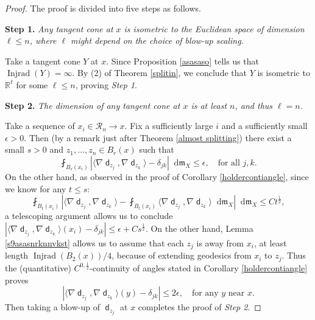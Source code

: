 \documentclass[11pt,reqno]{amsart}
\theoremstyle{definition}
\numberwithin{equation}{section}
\newcommand{\dR}{\mathbb{R}}
\newcommand{\di}{\mathop{}\!\mathrm{d}}
\newcommand{\meas}{\mathfrak{m}}
\DeclareMathOperator{\dist}{\mathsf{d}}
\DeclareMathOperator{\Injrad}{Injrad}
\begin{document}
\begin{proof}
The proof is divided into five steps as follows.

\smallskip

\textbf{Step 1.} \textit{Any tangent cone at $x$ is isometric to the Euclidean space of dimension $\ell \le n$, where $\ell$ might depend on the choice of blow-up scaling.}

\smallskip

Take a tangent cone $Y$ at $x$. Since Proposition \ref{asasaso} tells us that
$
    \Injrad(Y)=\infty.
$
By (2) of Theorem \ref{splitin}, we conclude that $Y$ is isometric to $\dR^{\ell}$
for some $\ell \leq n$, proving \textit{Step 1}.
 

\smallskip


\textbf{Step 2.} \textit{The dimension of any tangent cone at $x$ is at least $n$, and thus $\ell = n$.}

\smallskip

Take a sequence of $x_i \in \mathcal{R}_n \to x$. Fix a sufficiently large $i$ and a sufficiently small $\epsilon>0$. Then (by a remark just after Theorem \ref{almost splitting}) there exist a small $s>0$ and $z_1, \ldots, z_n \in B_r(x)$  such that 
\begin{equation}\label{eq:spl}
\fint_{B_s(x_i)}\left| \langle \nabla \dist_{z_j}, \nabla \dist_{z_k}\rangle-\delta_{jk}\right| \di \meas_X \le \epsilon, \quad \text{for all $j, k$.}
\end{equation}
On the other hand, as observed in the proof of Corollary \ref{holdercontiangle}, since we know for any $t \le s$:
\begin{equation}\label{eq:splsaas}
\fint_{B_t(x_i)}\left| \langle \nabla \dist_{z_j}, \nabla \dist_{z_k}\rangle-\fint_{B_t(x_i)}\langle \nabla \dist_{z_j}, \nabla \dist_{z_k}\rangle \di \meas_X\right| \di \meas_X \le Ct^{\frac{1}{2}},
\end{equation}
a telescoping argument allows us to conclude 
$
    \left|\langle \nabla \dist_{z_j}, \nabla \dist_{z_k}\rangle(x_i) -\delta_{jk} \right| \le \epsilon+Cs^{\frac{1}{2}}.
$
On the other hand, Lemma \ref{s9asasnrknnvkst} allows us to assume that each $z_j$ is away from $x_i$, at least length $\Injrad(B_2(x))/4$, because of extending geodesics from $x_i$ to $z_j$.
Thus the (quantitative) $C^{0,\frac{1}{2}}$-continuity of angles stated in Corollary \ref{holdercontiangle} proves
\begin{equation}\label{asas8hasbasi}
    \left|\langle \nabla \dist_{z_j}, \nabla \dist_{z_k}\rangle(y) -\delta_{jk} \right| \le 2\epsilon, \quad \text{for any $y$ near $x$.}
\end{equation}
Then taking a blow-up of $\dist_{z_j}$ at $x$ completes the proof of \textit{Step 2}.



\end{proof}
\end{document}
